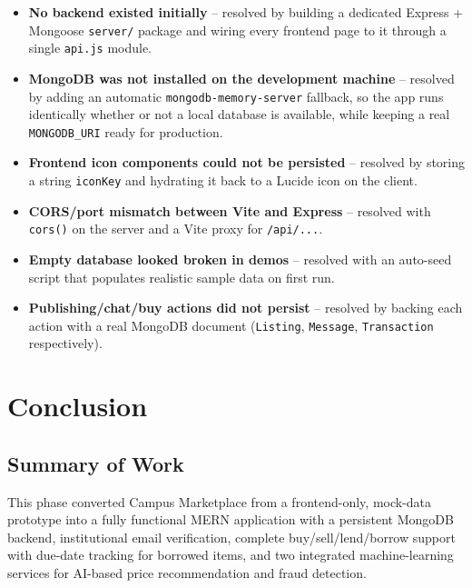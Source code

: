 \documentclass[12pt]{report}
\begin{document}
\begin{itemize}
    \item \textbf{No backend existed initially} -- resolved by building a dedicated
    Express + Mongoose \texttt{server/} package and wiring every frontend page to it through
    a single \texttt{api.js} module.
    \item \textbf{MongoDB was not installed on the development machine} -- resolved by adding
    an automatic \texttt{mongodb-memory-server} fallback, so the app runs identically whether
    or not a local database is available, while keeping a real \texttt{MONGODB\_URI} ready for
    production.
    \item \textbf{Frontend icon components could not be persisted} -- resolved by storing a
    string \texttt{iconKey} and hydrating it back to a Lucide icon on the client.
    \item \textbf{CORS/port mismatch between Vite and Express} -- resolved with \texttt{cors()}
    on the server and a Vite proxy for \texttt{/api/...}.
    \item \textbf{Empty database looked broken in demos} -- resolved with an auto-seed script
    that populates realistic sample data on first run.
    \item \textbf{Publishing/chat/buy actions did not persist} -- resolved by backing each
    action with a real MongoDB document (\texttt{Listing}, \texttt{Message},
    \texttt{Transaction} respectively).
\end{itemize}

\chapter{Conclusion}

\section{Summary of Work}
This phase converted Campus Marketplace from a frontend-only, mock-data prototype into a
fully functional MERN application with a persistent MongoDB backend, institutional email
verification, complete buy/sell/lend/borrow support with due-date tracking for borrowed
items, and two integrated machine-learning services for AI-based price recommendation and
fraud detection.
\end{document}
